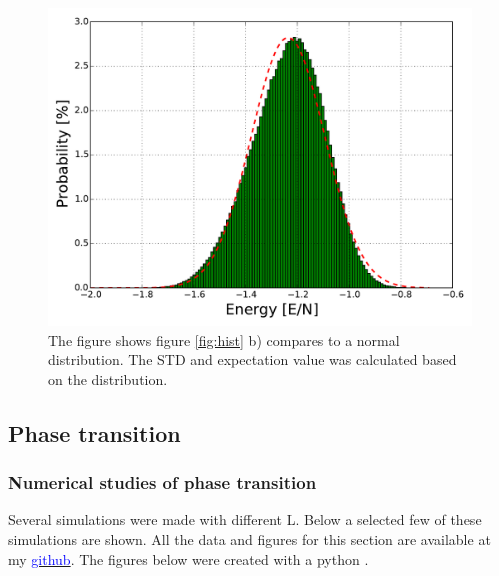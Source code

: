 \begin{figure}[H]
    \centering
    \includegraphics[width=0.6\linewidth]{result/bilder/hist/compared-hist}
    \caption{The figure shows figure \ref{fig:hist} b) compares to a normal distribution. The STD and expectation value was calculated based on the distribution.}
    \label{fig:hist-normal}
\end{figure}























\pagebreak
\subsection{Phase transition}



\subsubsection{Numerical studies of phase transition}

Several simulations were made with different L. Below a selected few of these simulations are shown. All the data and figures for this section are available at my \href{https://github.com/erikfsk/Project-4/tree/master/Project4/Result/4e/}{\textcolor{blue}{github}}. The figures below were created with a python \href{https://github.com/erikfsk/Project-4/blob/master/Project4/Result/4e/plot-4e.py}{\color{blue}{script}}.

